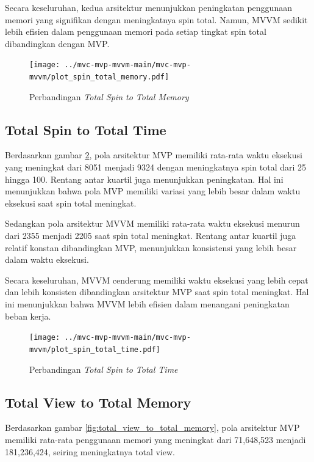 \documentclass[conference]{IEEEtran}
\begin{document}
	Secara keseluruhan, kedua arsitektur menunjukkan peningkatan penggunaan memori yang signifikan dengan meningkatnya spin total. Namun, MVVM sedikit lebih efisien dalam penggunaan memori pada setiap tingkat spin total dibandingkan dengan MVP. 
	
	\begin{figure}[h]
		\centering
		\texttt{[image: ../mvc-mvp-mvvm-main/mvc-mvp-mvvm/plot\_spin\_total\_memory.pdf]}
		\caption{Perbandingan \textit{Total Spin to Total Memory}}
		\label{fig:total_spin_to_total_memory}
	\end{figure}
	
	\subsection{Total Spin to Total Time}
	Berdasarkan gambar \ref{fig:total_spin_to_total_time}, pola arsitektur MVP memiliki rata-rata waktu eksekusi yang meningkat dari 8051 menjadi 9324 dengan meningkatnya spin total dari 25 hingga 100. Rentang antar kuartil juga menunjukkan peningkatan. Hal ini menunjukkan bahwa pola MVP memiliki variasi yang lebih besar dalam waktu eksekusi saat spin total meningkat.
	
	Sedangkan pola arsitektur MVVM memiliki rata-rata waktu eksekusi menurun dari 2355 menjadi 2205 saat spin total meningkat. Rentang antar kuartil juga relatif konstan dibandingkan MVP, menunjukkan konsistensi yang lebih besar dalam waktu eksekusi.
	
	Secara keseluruhan, MVVM cenderung memiliki waktu eksekusi yang lebih cepat dan lebih konsisten dibandingkan arsitektur MVP saat spin total meningkat. Hal ini menunjukkan bahwa MVVM lebih efisien dalam menangani peningkatan beban kerja.
	
	\vspace{5cm}
	
	\begin{figure}[h]
		\centering
		\texttt{[image: ../mvc-mvp-mvvm-main/mvc-mvp-mvvm/plot\_spin\_total\_time.pdf]}
		\caption{Perbandingan \textit{Total Spin to Total Time}}
		\label{fig:total_spin_to_total_time}
	\end{figure}
	
	\subsection{Total View to Total Memory}
	Berdasarkan gambar \ref{fig:total_view_to_total_memory}, pola arsitektur MVP memiliki rata-rata penggunaan memori yang meningkat dari 71,648,523 menjadi 181,236,424, seiring meningkatnya total view. 
	
\end{document}
